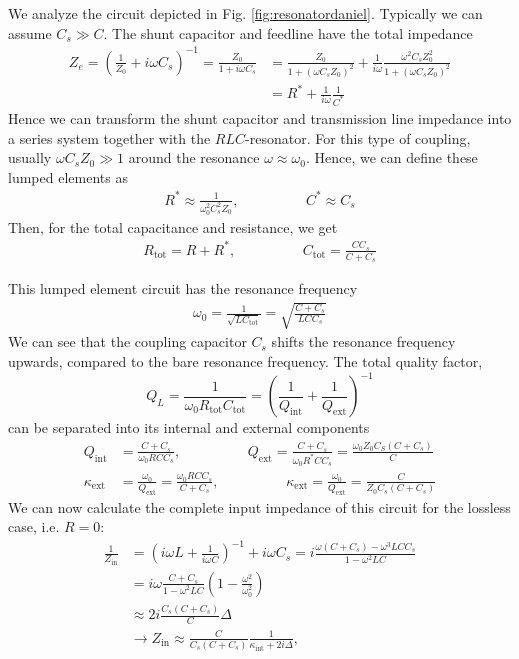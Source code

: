 We analyze the circuit depicted in Fig. \ref{fig:resonatordaniel}. Typically we can assume $C_s\gg C$. The shunt capacitor and feedline have the total impedance
\begin{align}
Z_e = \left(\frac{1}{Z_0}+i\omega C_s\right)^{-1} = \frac{Z_0}{1+i\omega C_s} &= \frac{Z_0}{1+(\omega C_s Z_0)^2} + \frac{1}{i\omega}\frac{\omega^2 C_s Z_0^2}{1+(\omega C_s Z_0)^2} \\%
&= R^* + \frac{1}{i\omega}\frac{1}{C^*}
\end{align}
Hence we can transform the shunt capacitor and transmission line impedance into a series system together with the $RLC$-resonator. For this type of coupling, usually $\omega C_s Z_0\gg1$ around the resonance $\omega\approx\omega_0$. Hence, we can define these lumped elements as
\begin{align}
R^* \approx \frac{1}{\omega_0^2 C_s^2 Z_0}, \hspace{2cm}C^*\approx C_s
\end{align}
Then, for the total capacitance and resistance, we get 
\begin{align}
R_\text{tot} = R+R^*, \hspace{2cm} C_\text{tot}=\frac{C C_s}{C + C_s}
\end{align}

This lumped element circuit has the resonance frequency
\begin{align}
\omega_0 = \frac{1}{\sqrt{LC_\text{tot}}} = \sqrt{\frac{C+C_s}{L C C_s}}
\end{align}
We can see that the coupling capacitor $C_s$ shifts the resonance frequency upwards, compared to the bare resonance frequency.
The total quality factor,
\begin{equation}
Q_L = \frac{1}{\omega_0 R_\text{tot}C_\text{tot}} = \left(\frac{1}{Q_\text{int}} + \frac{1}{Q_\text{ext}}\right)^{-1}
\end{equation}
can be separated into its internal and external components
\begin{align}
Q_\text{int} &= \frac{C+C_s}{\omega_0 R C C_s}, \hspace{2cm} Q_\text{ext} = \frac{C+C_s}{\omega_0 R^* C C_s} = \frac{\omega_0 Z_0 C_S (C+C_s)}{C} \\%
\kappa_\text{ext} &= \frac{\omega_0}{Q_\text{ext}} = \frac{\omega_0 R C C_s}{C+C_s}, \hspace{2cm} \kappa_\text{ext} = \frac{\omega_0}{Q_\text{ext}} = \frac{C}{Z_0 C_s (C+C_s)}
\end{align}
We can now calculate the complete input impedance of this circuit for the lossless case, i.e. $R=0$:
\begin{align}
\frac{1}{Z_\text{in}}&=\left(i\omega L + \frac{1}{i\omega C}\right)^{-1} + i\omega C_s = i\frac{\omega(C+C_s)-\omega^3LCC_s}{1-\omega^2LC} \\%
&=i\omega\frac{C+C_s}{1-\omega^2LC}\left(1-\frac{\omega^2}{\omega_0^2}\right) \\%
&\approx2i\frac{C_s(C+C_s)}{C}\Delta \\%
&\longrightarrow Z_\text{in} \approx \frac{C}{C_s (C+C_s)}\frac{1}{\kappa_\text{int}+2i\Delta},
\end{align}

